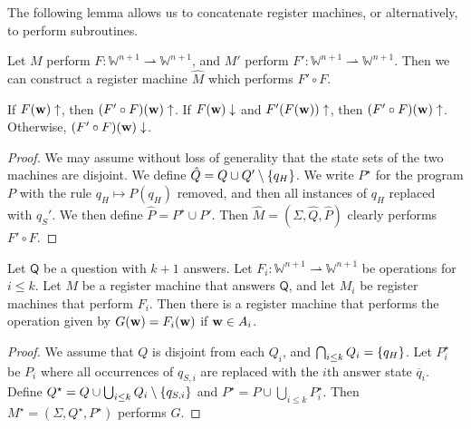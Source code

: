 The following lemma allows us to concatenate register machines, or alternatively, to perform subroutines.
\begin{lemma}[concatenation]
	Let \( M \) perform \( F \colon \mathbb W^{n+1} \rightharpoonup \mathbb W^{n+1} \), and \( M' \) perform \( F' \colon \mathbb W^{n+1} \rightharpoonup \mathbb W^{n+1} \).
	Then we can construct a register machine \( \hat M \) which performs \( F' \circ F \).
\end{lemma}
\begin{remark}
	If \( F(\vb w) \uparrow \), then \( (F' \circ F)(\vb w) \uparrow \).
	If \( F(\vb w) \downarrow \) and \( F'(F(\vb w)) \uparrow \), then \( (F' \circ F)(\vb w) \uparrow \).
	Otherwise, \( (F' \circ F)(\vb w) \downarrow \).
\end{remark}
\begin{proof}
	We may assume without loss of generality that the state sets of the two machines are disjoint.
	We define \( \hat Q = Q \cup Q' \setminus \qty{q_H} \).
	We write \( P^\star \) for the program \( P \) with the rule \( q_H \mapsto P(q_H) \) removed, and then all instances of \( q_H \) replaced with \( q_S' \).
	We then define \( \hat P = P^\star \cup P' \).
	Then \( \hat M = (\Sigma, \hat Q, \hat P) \) clearly performs \( F' \circ F \).
\end{proof}
\begin{lemma}
	Let \( \mathsf Q \) be a question with \( k + 1 \) answers.
	Let \( F_i \colon \mathbb W^{n+1} \rightharpoonup \mathbb W^{n+1} \) be operations for \( i \leq k \).
	Let \( M \) be a register machine that answers \( \mathsf Q \), and let \( M_i \) be register machines that perform \( F_i \).
	Then there is a register machine that performs the operation given by \( G(\vb w) = F_i(\vb w) \) if \( \vb w \in A_i \).
\end{lemma}
\begin{proof}
	We assume that \( Q \) is disjoint from each \( Q_i \), and \( \bigcap_{i \leq k} Q_i = \qty{q_H} \).
	Let \( P_i^\star \) be \( P_i \) where all occurrences of \( q_{S,i} \) are replaced with the \( i \)th answer state \( \overline q_i \).
	Define \( Q^\star = Q \cup \bigcup_{i \leq k} Q_i \setminus \qty{q_{S,i}} \) and \( P^\star = P \cup \bigcup_{i \leq k} P_i^\star \).
	Then \( M^\star = (\Sigma, Q^\star, P^\star) \) performs \( G \).
\end{proof}

